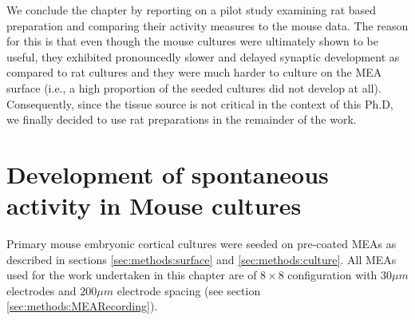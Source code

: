      We conclude the chapter by reporting on a pilot study examining rat based preparation and comparing their activity measures to the mouse data. The reason for this is that even though the mouse cultures were ultimately shown to be useful, they exhibited pronouncedly slower and delayed synaptic development as compared to rat cultures and they were much harder to culture on the MEA surface (i.e., a high proportion of the seeded cultures did not develop at all). Consequently, since the tissue source is not critical in the context of this Ph.D, we finally decided to use rat preparations in the remainder of the work.
        	
    \section{Development of spontaneous activity in Mouse cultures}
    \label{sec:activity:spontActivity}
    Primary mouse embryonic cortical cultures were seeded on pre-coated MEAs as described in sections \ref{sec:methods:surface} and \ref{sec:methods:culture}. All MEAs used for the work undertaken in this chapter are of \(8\times8\) configuration with \(30 \mu m\) electrodes and \(200 \mu m\) electrode spacing (see section \ref{sec:methods:MEARecording}).

